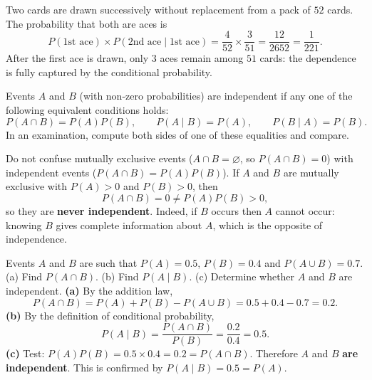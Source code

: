 \documentclass[11pt]{article}
\newcommand{\cle}[1]{{\popxbold\color{popdark}#1}}
\newcounter{popsec}
\newcounter{popsub}
\newcommand{\courssub}[1]{%
  \stepcounter{popsub}%
  \par\vspace{9pt}\noindent{\popxbold\fontsize{11.5}{13}\selectfont\color{popink}{\color{poporange}\thepopsec.\thepopsub}\hspace{6pt}#1}\par\nopagebreak\vspace{4pt}
}
\begin{document}
\begin{exemplebox}
Two cards are drawn successively without replacement from a pack of $52$ cards. The probability that both are aces is
\[ P(\text{1st ace})\times P(\text{2nd ace}\mid\text{1st ace}) = \frac{4}{52}\times\frac{3}{51} = \frac{12}{2652} = \frac{1}{221}. \]
After the first ace is drawn, only $3$ aces remain among $51$ cards: the dependence is fully captured by the conditional probability.
\end{exemplebox}

\courssub{Testing for Independence}

\begin{definition}
Events $A$ and $B$ (with non-zero probabilities) are independent if any one of the following equivalent conditions holds:
\[ P(A\cap B) = P(A)P(B), \qquad P(A\mid B) = P(A), \qquad P(B\mid A) = P(B). \]
In an examination, compute both sides of one of these equalities and compare.
\end{definition}

\begin{attention}
Do not confuse \cle{mutually exclusive} events ($A\cap B=\varnothing$, so $P(A\cap B)=0$) with \cle{independent} events ($P(A\cap B)=P(A)P(B)$). If $A$ and $B$ are mutually exclusive with $P(A)>0$ and $P(B)>0$, then
\[ P(A\cap B) = 0 \neq P(A)P(B) > 0, \]
so they are \textbf{never independent}. Indeed, if $B$ occurs then $A$ cannot occur: knowing $B$ gives complete information about $A$, which is the opposite of independence.
\end{attention}

\begin{exoresolu}
Events $A$ and $B$ are such that $P(A)=0.5$, $P(B)=0.4$ and $P(A\cup B)=0.7$.
(a) Find $P(A\cap B)$. (b) Find $P(A\mid B)$. (c) Determine whether $A$ and $B$ are independent.
\tcblower
\textbf{(a)} By the addition law,
\[ P(A\cap B) = P(A)+P(B)-P(A\cup B) = 0.5+0.4-0.7 = 0.2. \]
\textbf{(b)} By the definition of conditional probability,
\[ P(A\mid B) = \frac{P(A\cap B)}{P(B)} = \frac{0.2}{0.4} = 0.5. \]
\textbf{(c)} Test: $P(A)P(B) = 0.5\times 0.4 = 0.2 = P(A\cap B)$. Therefore $A$ and $B$ \textbf{are independent}. This is confirmed by $P(A\mid B)=0.5=P(A)$.
\end{exoresolu}
\end{document}
